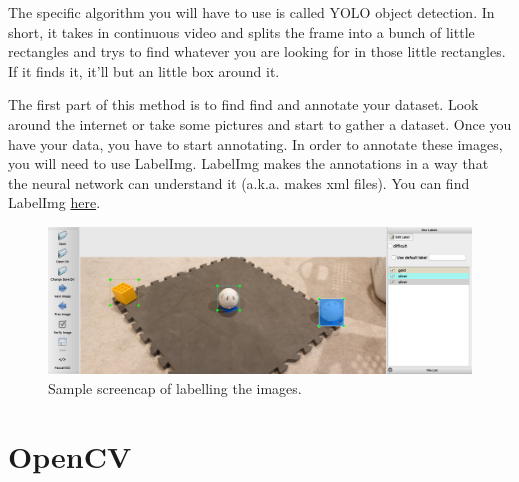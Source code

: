 \documentclass[../main.tex]{subfiles}
\begin{document}
The specific algorithm you will have to use is called YOLO object detection. In short, it takes in continuous video and splits the frame into a bunch of little rectangles and trys to find whatever you are looking for in those little rectangles. If it finds it, it'll but an little box around it. 

The first part of this method is to find find and annotate your dataset. Look around the internet or take some pictures and start to gather a dataset. Once you have your data, you have to start annotating. In order to annotate these images, you will need to use LabelImg. LabelImg makes the annotations in a way that the neural network can understand it (a.k.a. makes xml files). You can find LabelImg  \href{https://github.com/tzutalin/labelImg}{here}.

\begin{figure}[H]
    \includegraphics[width=400pt]{sections/vision/images/LabelImg.png}
    \caption{Sample screencap of labelling the images.}
\end{figure}

\section{OpenCV}
\end{document}
